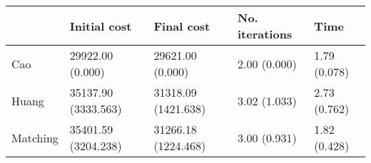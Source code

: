 \begin{tabular}{lllll}
\toprule
{} &         Initial cost &           Final cost & No. iterations &          Time \\
\midrule
Cao      &     29922.00 (0.000) &     29621.00 (0.000) &   2.00 (0.000) &  1.79 (0.078) \\
Huang    &  35137.90 (3333.563) &  31318.09 (1421.638) &   3.02 (1.033) &  2.73 (0.762) \\
Matching &  35401.59 (3204.238) &  31266.18 (1224.468) &   3.00 (0.931) &  1.82 (0.428) \\
\bottomrule
\end{tabular}

